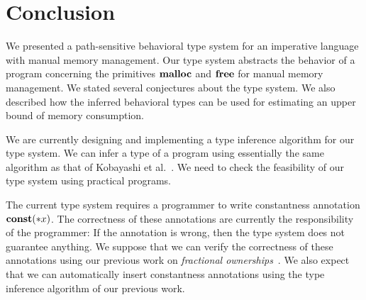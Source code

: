 \section{Conclusion}
\label{sec:conclusion}

We presented a path-sensitive behavioral type system for an imperative
language with manual memory management.  Our type system abstracts the
behavior of a program concerning the primitives $\mathbf{malloc}$ and $\mathbf{free}$
for manual memory management.  We stated several conjectures about the
type system.  We also described how the inferred behavioral types can be
used for estimating an upper bound of memory consumption.

We are currently designing and implementing a type inference algorithm
for our type system.  We can infer a type of a program using essentially
the same algorithm as that of Kobayashi et
al.~\cite{DBLP:journals/lmcs/KobayashiSW06}.  We need to check the
feasibility of our type system using practical programs.

The current type system requires a programmer to write constantness
annotation $\mathbf{const}(*x)$.  The correctness of these annotations are
currently the responsibility of the programmer: If the annotation is
wrong, then the type system does not guarantee anything.  We suppose
that we can verify the correctness of these annotations using our
previous work on \emph{fractional
ownerships}~\cite{DBLP:conf/aplas/SuenagaK09}.  We also expect that we
can automatically insert constantness annotations using the type
inference algorithm of our previous work.




